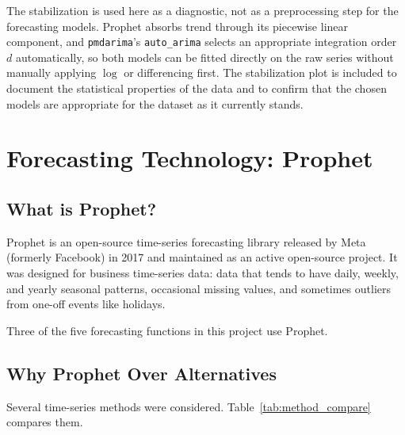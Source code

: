 \documentclass[12pt, a4paper]{report}
\begin{document}
The stabilization is used here as a diagnostic, not as a preprocessing step
for the forecasting models. Prophet absorbs trend through its piecewise
linear component, and \texttt{pmdarima}'s \texttt{auto\_arima} selects an
appropriate integration order~$d$ automatically, so both models can be fitted
directly on the raw series without manually applying $\log$ or differencing
first. The stabilization plot is included to document the statistical
properties of the data and to confirm that the chosen models are appropriate
for the dataset as it currently stands.

\section{Forecasting Technology: Prophet}

\subsection{What is Prophet?}

Prophet is an open-source time-series forecasting library released by Meta
(formerly Facebook) in 2017 and maintained as an active open-source project.
It was designed for business time-series data: data that tends to have daily,
weekly, and yearly seasonal patterns, occasional missing values, and sometimes
outliers from one-off events like holidays.

Three of the five forecasting functions in this project use Prophet.

\subsection{Why Prophet Over Alternatives}

Several time-series methods were considered. Table~\ref{tab:method_compare} compares
them.
\end{document}
